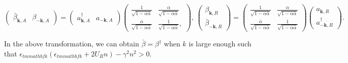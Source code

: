 \documentclass[aps,onecolumn,superscriptaddress,notitlepage,longbibliography]{revtex4-1}
\newcommand{\tmmathbf}[1]{\ensuremath{\boldsymbol{#1}}}
\begin{document}
\begin{equation}
\left(\begin{array}{cc}\bar{\beta}_{\tmmathbf{k}, A} &
  \beta_{- \tmmathbf{k}, A}\end{array}\right) = \left(\begin{array}{cc}a^{\dagger}_{\tmmathbf{k}, A} &
  a_{- \tmmathbf{k}, A}\end{array}\right)\left(\begin{array}{cc}
  \frac{1}{\sqrt{1 - \alpha \bar{\alpha}}} & \frac{\alpha}{\sqrt{1 - \alpha
  \bar{\alpha}}}\\
  \frac{\bar{\alpha}}{\sqrt{1 - \alpha \bar{\alpha}}} & \frac{1}{\sqrt{1 -
  \alpha \bar{\alpha}}},
  \end{array}\right), \,
  \left(\begin{array}{c}
    \beta_{\tmmathbf{k}, R}\\
    \bar{\beta}_{- \tmmathbf{k}, R}
  \end{array}\right) = \left(\begin{array}{cc}
    \frac{1}{\sqrt{1 - \alpha \bar{\alpha}}} & \frac{\alpha}{\sqrt{1 - \alpha
    \bar{\alpha}}}\\
    \frac{\bar{\alpha}}{\sqrt{1 - \alpha \bar{\alpha}}} & \frac{1}{\sqrt{1 -
    \alpha \bar{\alpha}}}
  \end{array}\right) \left(\begin{array}{c}
    a_{\tmmathbf{k}, R}\\
    a^{\dagger}_{- \tmmathbf{k}, R}
  \end{array}\right) .
\end{equation} 

In the above transformation, we can obtain $\bar{\beta}=\beta^\dagger$ when $k$ is large enough such that $\epsilon_{tmmathbf{k}}(\epsilon_{tmmathbf{k}}+2U_Rn)-\gamma^2n^2>0$.
\end{document}
